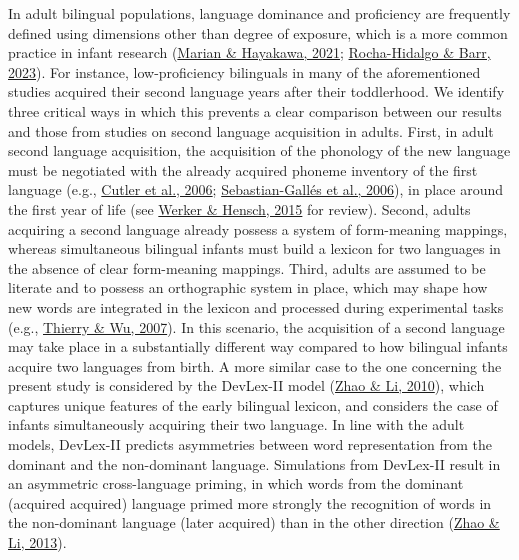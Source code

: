 \documentclass[
]{article}
\begin{document}
In adult bilingual populations, language dominance and proficiency are
frequently defined using dimensions other than degree of exposure, which
is a more common practice in infant research
(\protect\hyperlink{ref-marian2021measuring}{Marian \& Hayakawa, 2021};
\protect\hyperlink{ref-rocha2023defining}{Rocha-Hidalgo \& Barr, 2023}).
For instance, low-proficiency bilinguals in many of the aforementioned
studies acquired their second language years after their toddlerhood. We
identify three critical ways in which this prevents a clear comparison
between our results and those from studies on second language
acquisition in adults. First, in adult second language acquisition, the
acquisition of the phonology of the new language must be negotiated with
the already acquired phoneme inventory of the first language (e.g.,
\protect\hyperlink{ref-cutler2006asymmetric}{Cutler et al., 2006};
\protect\hyperlink{ref-sebastian2006first}{Sebastian-Gallés et al.,
2006}), in place around the first year of life (see
\protect\hyperlink{ref-werker2015critical}{Werker \& Hensch, 2015} for
review). Second, adults acquiring a second language already possess a
system of form-meaning mappings, whereas simultaneous bilingual infants
must build a lexicon for two languages in the absence of clear
form-meaning mappings. Third, adults are assumed to be literate and to
possess an orthographic system in place, which may shape how new words
are integrated in the lexicon and processed during experimental tasks
(e.g., \protect\hyperlink{ref-thierry2007brain}{Thierry \& Wu, 2007}).
In this scenario, the acquisition of a second language may take place in
a substantially different way compared to how bilingual infants acquire
two languages from birth. A more similar case to the one concerning the
present study is considered by the DevLex-II model
(\protect\hyperlink{ref-zhao2010bilingual}{Zhao \& Li, 2010}), which
captures unique features of the early bilingual lexicon, and considers
the case of infants simultaneously acquiring their two language. In line
with the adult models, DevLex-II predicts asymmetries between word
representation from the dominant and the non-dominant language.
Simulations from DevLex-II result in an asymmetric cross-language
priming, in which words from the dominant (acquired acquired) language
primed more strongly the recognition of words in the non-dominant
language (later acquired) than in the other direction
(\protect\hyperlink{ref-zhao2013simulating}{Zhao \& Li, 2013}).
\end{document}
